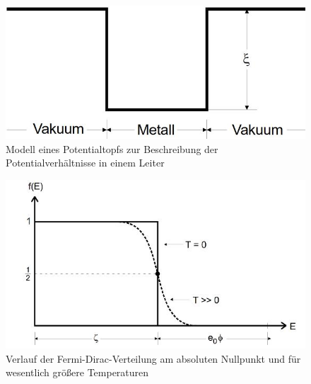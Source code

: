 \begin{figure}
\centering
\includegraphics[width=\linewidth-70pt,height=\textheight-70pt,keepaspectratio]{content/images/Pot.jpg}
\caption{Modell eines Potentialtopfs zur Beschreibung der Potentialverhältnisse in einem Leiter\cite{V504}}
\label{fig:pot}
\end{figure}

\begin{figure}
\centering
\includegraphics[width=\linewidth-70pt,height=\textheight-70pt,keepaspectratio]{content/images/fermi.jpg}
\caption{Verlauf der Fermi-Dirac-Verteilung am absoluten Nullpunkt und für wesentlich größere Temperaturen\cite{V504}\label{fig:fermi}}
\end{figure}